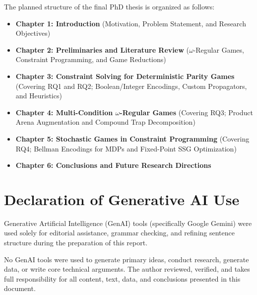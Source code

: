 \documentclass{article}
\begin{document}
The planned structure of the final PhD thesis is organized as follows:
\begin{itemize}
    \item \textbf{Chapter 1: Introduction} (Motivation, Problem Statement, and Research Objectives)
    \item \textbf{Chapter 2: Preliminaries and Literature Review} ($\omega$-Regular Games, Constraint Programming, and Game Reductions)
    \item \textbf{Chapter 3: Constraint Solving for Deterministic Parity Games} (Covering RQ1 and RQ2; Boolean/Integer Encodings, Custom Propagators, and Heuristics)
    \item \textbf{Chapter 4: Multi-Condition $\omega$-Regular Games} (Covering RQ3; Product Arena Augmentation and Compound Trap Decomposition)
    \item \textbf{Chapter 5: Stochastic Games in Constraint Programming} (Covering RQ4; Bellman Encodings for MDPs and Fixed-Point SSG Optimization)
    \item \textbf{Chapter 6: Conclusions and Future Research Directions}
\end{itemize}

\section{Declaration of Generative AI Use}

Generative Artificial Intelligence (GenAI) tools (specifically Google Gemini) were used solely for editorial assistance, grammar checking, and refining sentence structure during the preparation of this report.

No GenAI tools were used to generate primary ideas, conduct research, generate data, or write core technical arguments. The author reviewed, verified, and takes full responsibility for all content, text, data, and conclusions presented in this document.





\newpage
\end{document}
